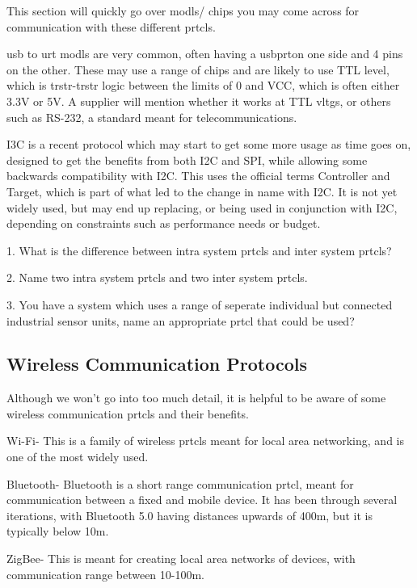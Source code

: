 \documentclass[a4paper,11pt]{report}
\newcommand{\Quiz}[1] %
{
\par\noindent %
\phantomsection %
\todo[inline, color=blue!30]{\textbf{#1}} %
\vspace{1em} %
}
\begin{document}
This section will quickly go over \gls{modl}s/ chips you may come across for communication with these different \gls{prtcl}s.

\gls{usb} to \gls{urt} \gls{modl}s are very common, often having a \gls{usb}\gls{prt}on one side and 4 pins on the other. These may use a range of chips and are likely to use TTL level, which is \gls{trstr}-\gls{trstr} logic between the limits of 0 and VCC, which is often either 3.3V or 5V. A supplier will mention whether it works at TTL \gls{vltg}s, or others such as RS-232, a standard meant for telecommunications.

I3C is a recent protocol which may start to get some more usage as time goes on, designed to get the benefits from both I2C and SPI, while allowing some backwards compatibility with I2C. This uses the official terms Controller and Target, which is part of what led to the change in name with I2C. It is not yet widely used, but may end up replacing, or being used in conjunction with I2C, depending on constraints such as performance needs or budget.

\Quiz{Quiz}

1. What is the difference between intra system \gls{prtcl}s and inter system \gls{prtcl}s?

2. Name two intra system \gls{prtcl}s and two inter system \gls{prtcl}s.

3. You have a system which uses a range of seperate individual but connected industrial sensor units, name an appropriate \gls{prtcl} that could be used?

\vspace*{1\baselineskip}

\subsection{Wireless Communication Protocols}

Although we won't go into too much detail, it is helpful to be aware of some wireless communication \gls{prtcl}s and their benefits.

Wi-Fi- This is a family of wireless \gls{prtcl}s meant for local area networking, and is one of the most widely used.

Bluetooth- Bluetooth is a short range communication \gls{prtcl}, meant for communication between a fixed and mobile device. It has been through several iterations, with Bluetooth 5.0 having distances upwards of 400m, but it is typically below 10m.

ZigBee- This is meant for creating local area networks of devices, with communication range between 10-100m.
\end{document}
